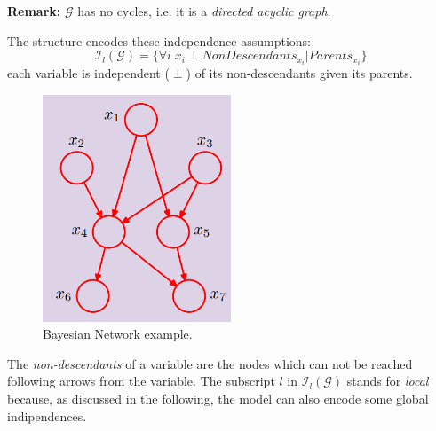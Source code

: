 \textbf{Remark:} $\mathcal{G}$ has no cycles, i.e. it is a \textit{directed
acyclic graph}.
\newline

The structure encodes these independence assumptions:
\begin{equation}
	\mathcal{I}_{l}(\mathcal{G}) = \{\forall i \; x_{i}\perp \mathit{NonDescendants}
	_{x_i}| Parents_{x_i}\}
\end{equation}
each variable is independent ($\perp$) of its non-descendants given its parents.

\begin{figure}[H]
	\centering
	\includegraphics[width=0.5\textwidth]{
		images/08_BayesianNetworks_bayesianNetworkExample.png
	}
	\caption{Bayesian Network example.}
	\label{fig:bayesianNetworkExample}
\end{figure}
The \textit{non-descendants} of a variable are the nodes which can not be
reached following arrows from the variable. The subscript $l$ in $\mathcal{I}_{l}
(\mathcal{G})$ stands for \textit{local} because, as discussed in the following,
the model can also encode some global indipendences.
\newline

